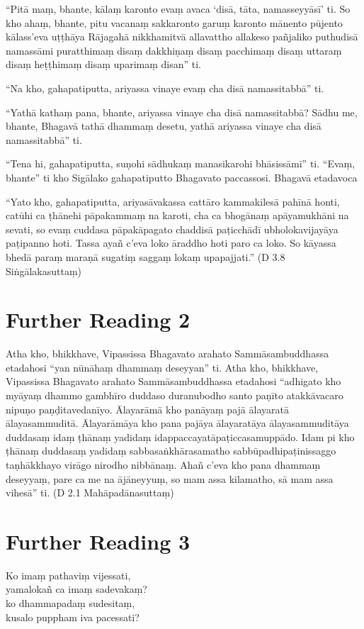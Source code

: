 “Pitā maṃ, bhante, kālaṃ karonto evaṃ avaca ‘disā, tāta, namasseyyāsī’ ti. So kho ahaṃ, bhante, pitu vacanaṃ sakkaronto garuṃ karonto mānento pūjento kālass’eva uṭṭhāya Rājagahā nikkhamitvā allavattho allakeso pañjaliko puthudisā namassāmi puratthimaṃ disaṃ dakkhiṇaṃ disaṃ pacchimaṃ disaṃ uttaraṃ disaṃ heṭṭhimaṃ disaṃ uparimaṃ disan” ti.

“Na kho, gahapatiputta, ariyassa vinaye evaṃ cha disā namassitabbā” ti.

“Yathā kathaṃ pana, bhante, ariyassa vinaye cha disā namassitabbā? Sādhu me, bhante, Bhagavā tathā dhammaṃ desetu, yathā ariyassa vinaye cha disā namassitabbā” ti.

“Tena hi, gahapatiputta, suṇohi sādhukaṃ manasikarohi bhāsissāmī” ti. “Evaṃ, bhante” ti kho Sigālako gahapatiputto Bhagavato paccassosi. Bhagavā etadavoca

“Yato kho, gahapatiputta, ariyasāvakassa cattāro kammakilesā pahīnā honti, catūhi ca ṭhānehi pāpakammaṃ na karoti, cha ca bhogānaṃ apāyamukhāni na sevati, so evaṃ cuddasa pāpakāpagato chaddisā paṭicchādī ubholokavijayāya paṭipanno hoti. Tassa ayañ c’eva loko āraddho hoti paro ca loko. So kāyassa bhedā paraṃ maraṇā sugatiṃ saggaṃ lokaṃ upapajjati.” \hfill(D 3.8 Siṅgālakasuttaṃ)

\section*{Further Reading 2}

Atha kho, bhikkhave, Vipassissa Bhagavato arahato Sammāsambuddhassa etadahosi “yan nūnāhaṃ dhammaṃ deseyyan” ti. Atha kho, bhikkhave, Vipassissa Bhagavato arahato Sammāsambuddhassa etadahosi “adhigato kho myāyaṃ dhammo gambhīro duddaso duranubodho santo paṇīto atakkāvacaro nipuṇo paṇḍitavedanīyo. Ālayarāmā kho panāyaṃ pajā ālayaratā ālayasammuditā. Ālayarāmāya kho pana pajāya ālayaratāya ālayasammuditāya duddasaṃ idaṃ ṭhānaṃ yadidaṃ idappaccayatāpaṭiccasamuppādo. Idam pi kho ṭhānaṃ duddasaṃ yadidaṃ sabbasaṅkhārasamatho sabbūpadhipaṭinissaggo taṇhākkhayo virāgo nirodho nibbānaṃ. Ahañ c’eva kho pana dhammaṃ deseyyaṃ, pare ca me na ājāneyyuṃ, so mam assa kilamatho, sā mam assa vihesā” ti. \hfill(D 2.1 Mahāpadānasuttaṃ)

\section*{Further Reading 3}

Ko imaṃ pathaviṃ vijessati,\\
yamalokañ ca imaṃ sadevakaṃ?\\
ko dhammapadaṃ sudesitaṃ,\\
kusalo puppham iva pacessati?

